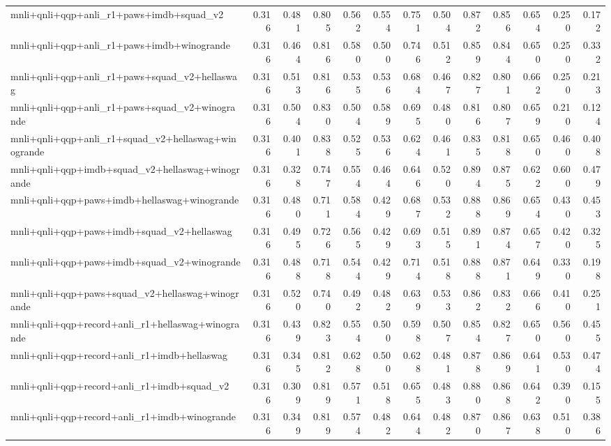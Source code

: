 \begin{table}[t]
\begin{tabular}{lrrrrrrrrrrrr}
    mnli+qnli+qqp+anli\_r1+paws+imdb+squad\_v2 & 0.316 & 0.481 & 0.805 & 0.562 & 0.554 & 0.751 & 0.504 & 0.872 & 0.856 & 0.654 & 0.250 & 0.172 \\
    mnli+qnli+qqp+anli\_r1+paws+imdb+winogrande & 0.316 & 0.464 & 0.816 & 0.580 & 0.500 & 0.746 & 0.512 & 0.859 & 0.844 & 0.650 & 0.250 & 0.332 \\
    mnli+qnli+qqp+anli\_r1+paws+squad\_v2+hellaswag & 0.316 & 0.513 & 0.816 & 0.535 & 0.536 & 0.684 & 0.467 & 0.827 & 0.801 & 0.662 & 0.250 & 0.213 \\
    mnli+qnli+qqp+anli\_r1+paws+squad\_v2+winogrande & 0.316 & 0.504 & 0.830 & 0.504 & 0.589 & 0.695 & 0.480 & 0.816 & 0.807 & 0.659 & 0.210 & 0.124 \\
    mnli+qnli+qqp+anli\_r1+squad\_v2+hellaswag+winogrande & 0.316 & 0.401 & 0.838 & 0.525 & 0.536 & 0.624 & 0.461 & 0.835 & 0.818 & 0.650 & 0.460 & 0.408 \\
    mnli+qnli+qqp+imdb+squad\_v2+hellaswag+winogrande & 0.316 & 0.328 & 0.747 & 0.554 & 0.464 & 0.646 & 0.520 & 0.894 & 0.875 & 0.622 & 0.600 & 0.479 \\
    mnli+qnli+qqp+paws+imdb+hellaswag+winogrande & 0.316 & 0.480 & 0.711 & 0.584 & 0.429 & 0.687 & 0.532 & 0.888 & 0.869 & 0.654 & 0.430 & 0.453 \\
    mnli+qnli+qqp+paws+imdb+squad\_v2+hellaswag & 0.316 & 0.495 & 0.726 & 0.565 & 0.429 & 0.693 & 0.515 & 0.891 & 0.874 & 0.657 & 0.420 & 0.325 \\
    mnli+qnli+qqp+paws+imdb+squad\_v2+winogrande & 0.316 & 0.488 & 0.718 & 0.544 & 0.429 & 0.714 & 0.518 & 0.888 & 0.871 & 0.649 & 0.330 & 0.198 \\
    mnli+qnli+qqp+paws+squad\_v2+hellaswag+winogrande & 0.316 & 0.520 & 0.740 & 0.492 & 0.482 & 0.639 & 0.533 & 0.862 & 0.832 & 0.666 & 0.410 & 0.251 \\
    mnli+qnli+qqp+record+anli\_r1+hellaswag+winogrande & 0.316 & 0.439 & 0.823 & 0.554 & 0.500 & 0.598 & 0.507 & 0.854 & 0.827 & 0.650 & 0.560 & 0.455 \\
    mnli+qnli+qqp+record+anli\_r1+imdb+hellaswag & 0.316 & 0.345 & 0.812 & 0.628 & 0.500 & 0.628 & 0.481 & 0.878 & 0.869 & 0.641 & 0.530 & 0.474 \\
    mnli+qnli+qqp+record+anli\_r1+imdb+squad\_v2 & 0.316 & 0.309 & 0.819 & 0.571 & 0.518 & 0.655 & 0.483 & 0.880 & 0.868 & 0.642 & 0.390 & 0.155 \\
    mnli+qnli+qqp+record+anli\_r1+imdb+winogrande & 0.316 & 0.349 & 0.819 & 0.574 & 0.482 & 0.644 & 0.482 & 0.870 & 0.867 & 0.638 & 0.510 & 0.386 \\

\end{tabular}
\end{table}
